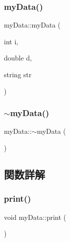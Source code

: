 \subsubsection{\texorpdfstring{my\+Data()}{myData()}\hspace{0.1cm}{\footnotesize\ttfamily [2/2]}}
{\footnotesize\ttfamily my\+Data\+::my\+Data (\begin{DoxyParamCaption}\item[{int}]{i,  }\item[{double}]{d,  }\item[{string}]{str }\end{DoxyParamCaption})\hspace{0.3cm}{\ttfamily [inline]}}

\mbox{\label{classmy_data_a89a5048237ec5c6d99312762123e7373}} 
\subsubsection{\texorpdfstring{$\sim$my\+Data()}{~myData()}}
{\footnotesize\ttfamily my\+Data\+::$\sim$my\+Data (\begin{DoxyParamCaption}{ }\end{DoxyParamCaption})\hspace{0.3cm}{\ttfamily [inline]}}



\subsection{関数詳解}
\mbox{\label{classmy_data_a7a0ed4bbdb3e43467ad2e5e1f937ef6e}} 
\subsubsection{\texorpdfstring{print()}{print()}}
{\footnotesize\ttfamily void my\+Data\+::print (\begin{DoxyParamCaption}{ }\end{DoxyParamCaption})\hspace{0.3cm}{\ttfamily [inline]}}

\mbox{\label{classmy_data_a3b0cc7aa7c618b11cf63ef94e66f4860}} 
